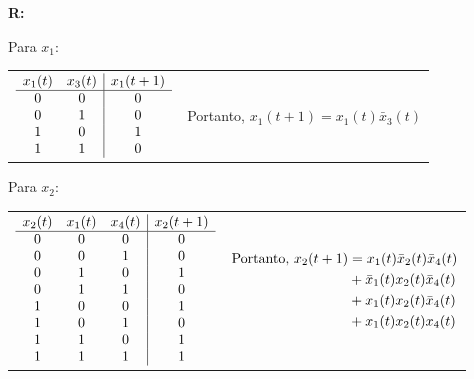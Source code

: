 \documentclass[12pt]{article}
\newcommand{\answer}[1]{{\fontfamily{\rmdefault}\selectfont \textbf{R:} #1}}
\begin{document}
\answer {

Para $x_1$:

\begin{tabular}{c l}
$\begin{array}{cc | c}
  x_1 (t) &  x_3 (t) & x_1 (t + 1) \\
  \hline
    0     &     0    &     0       \\
    0     &     1    &     0       \\
    1     &     0    &     1       \\
    1     &     1    &     0       
\end{array}$

&

Portanto, $x_1 (t + 1) = x_1 (t) \bar x_3 (t)$ 
\end{tabular}


\vspace{.2cm}
Para $x_2$:

\begin{tabular}{c l}
$\begin{array}{ccc | c}
  x_2 (t) &  x_1 (t) & x_4 (t) & x_2 (t + 1) \\
  \hline 
    0     &     0    &     0   &     0       \\
    0     &     0    &     1   &     0       \\
    0     &     1    &     0   &     1       \\
    0     &     1    &     1   &     0       \\    
    1     &     0    &     0   &     1       \\
    1     &     0    &     1   &     0       \\
    1     &     1    &     0   &     1       \\
    1     &     1    &     1   &     1       \\    
\end{array}$

&

$\begin{aligned}[t]
  \textup{Portanto, } 
      x_2 (t + 1) &= x_1 (t) \bar{x}_2 (t)  \bar{x}_4(t) \\
                  &+ \bar{x}_1 (t) x_2 (t) \bar{x}_4 (t) \\
                  &+ x_1 (t) x_2 (t) \bar{x}_4(t) \\
                  &+ x_1 (t) x_2 (t) x_4(t) 
\end{aligned}$
\end{tabular}

}
\end{document}
